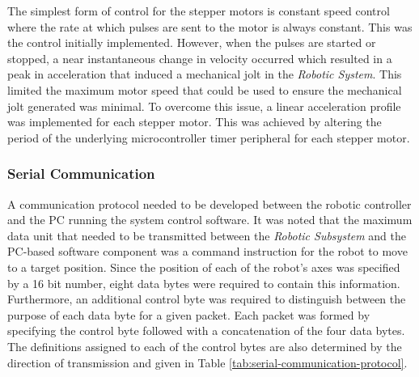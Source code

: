 The simplest form of control for the stepper motors is constant speed control where the rate at which pulses are sent to the motor is always constant. This was the control initially implemented. However, when the pulses are started or stopped, a near instantaneous change in velocity occurred which resulted in a peak in acceleration that induced a mechanical jolt in the \textit{Robotic System}. This limited the maximum motor speed that could be used to ensure the mechanical jolt generated was minimal. To overcome this issue, a linear acceleration profile was implemented for each stepper motor. This was achieved by altering the period of the underlying microcontroller timer peripheral for each stepper motor.

\subsubsection{Serial Communication} \label{sec:Serial Communication}

A communication protocol needed to be developed between the robotic controller and the PC running the system control software. It was noted that the maximum data unit that needed to be transmitted between the \textit{Robotic Subsystem} and the PC-based software component was a command instruction for the robot to move to a target position. Since the position of each of the robot's axes was specified by a 16 bit number, eight data bytes were required to contain this information. Furthermore, an additional control byte was required to distinguish between the purpose of each data byte for a given packet. Each packet was formed by specifying the control byte followed with a concatenation of the four data bytes. The definitions assigned to each of the control bytes are also determined by the direction of transmission and given in Table \ref{tab:serial-communication-protocol}.

